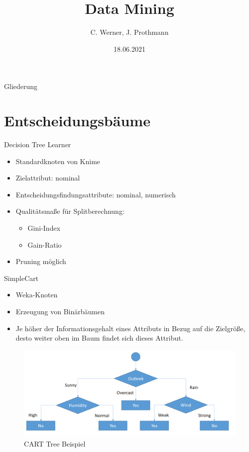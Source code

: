 \documentclass[
	handout,
  	aspectratio=169
]{beamer}
\title[Semesterprojekt KNIME]{Data Mining}
\date{18.06.2021}
\author[C. Werner, J. Prothmann]{C. Werner, J. Prothmann}
\institute{Bereich Elektrotechnik und Informatik}
\begin{document}
	\begin{frame}[plain]
		\titlepage
	\end{frame}

	\begin{frame}[allowframebreaks]{Gliederung}
		\tableofcontents
	\end{frame}
		
	\section{Entscheidungsbäume}
	
		\begin{frame}{Decision Tree Learner}
			\begin{itemize}
				\item Standardknoten von Knime
				\item Zielattribut: nominal
				\item Entscheidungsfindungsattribute: nominal, numerisch
				\item Qualitätsmaße für Splitberechnung:
				\begin{itemize}
					\item Gini-Index
					\item Gain-Ratio
				\end{itemize}
				\item Pruning möglich
			\end{itemize}
		\end{frame}

		\begin{frame}{SimpleCart}	
			\begin{itemize}
				\item Weka-Knoten
				\item Erzeugung von Binärbäumen
				\item Je höher der Informationsgehalt eines Attributs in Bezug auf die Zielgröße, desto weiter oben im Baum findet
sich dieses Attribut. 
			\end{itemize}
			\begin{center}
				\begin{figure}[h]
					\includegraphics[scale=0.2]{../pictures/cart-tree.png}
					\caption{CART Tree Beispiel}		
				\end{figure}		
			\end{center}
		\end{frame}
\end{document}
